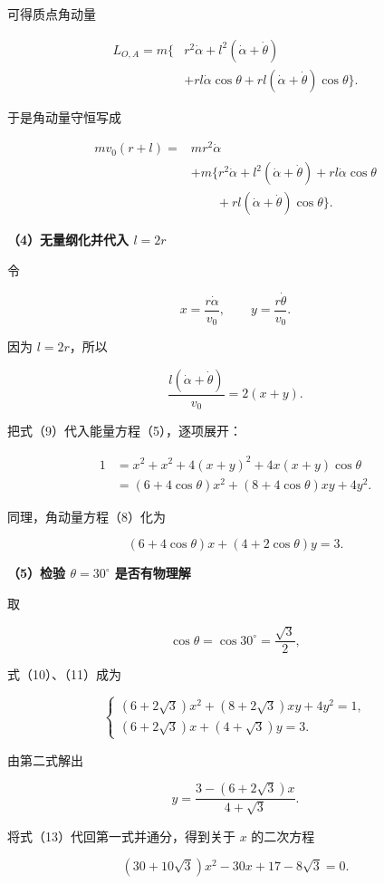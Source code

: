\documentclass[12pt,a4paper,UTF8]{ctexart}
\begin{document}
可得质点角动量

\[
\begin{aligned}
L_{O,A}=m\{&r^2\dot\alpha+l^2(\dot\alpha+\dot\theta)\\
&+rl\dot\alpha\cos\theta
+rl(\dot\alpha+\dot\theta)\cos\theta\}.
\end{aligned}
\tag{7}
\]

于是角动量守恒写成

\[
\begin{aligned}
mv_0(r+l)={}&mr^2\dot\alpha\\
&+m\{r^2\dot\alpha+l^2(\dot\alpha+\dot\theta)
+rl\dot\alpha\cos\theta\\
&\qquad+rl(\dot\alpha+\dot\theta)\cos\theta\}.
\end{aligned}
\tag{8}
\]

\textbf{（4）无量纲化并代入 \(l=2r\)}

令

\[
x=\frac{r\dot\alpha}{v_0},
\qquad
y=\frac{r\dot\theta}{v_0}.
\tag{9}
\]

因为 \(l=2r\)，所以

\[
\frac{l(\dot\alpha+\dot\theta)}{v_0}=2(x+y).
\]

把式（9）代入能量方程（5），逐项展开：

\[
\begin{aligned}
1
&=x^2+x^2+4(x+y)^2+4x(x+y)\cos\theta\\
&=(6+4\cos\theta)x^2
+(8+4\cos\theta)xy+4y^2.
\end{aligned}
\tag{10}
\]

同理，角动量方程（8）化为

\[
(6+4\cos\theta)x+(4+2\cos\theta)y=3.
\tag{11}
\]

\textbf{（5）检验 \(\theta=30^\circ\) 是否有物理解}

取

\[
\cos\theta=\cos30^\circ=\frac{\sqrt3}{2},
\]

式（10）、（11）成为

\[
\begin{cases}
(6+2\sqrt3)x^2+(8+2\sqrt3)xy+4y^2=1,\\
(6+2\sqrt3)x+(4+\sqrt3)y=3.
\end{cases}
\tag{12}
\]

由第二式解出

\[
y=\frac{3-(6+2\sqrt3)x}{4+\sqrt3}.
\tag{13}
\]

将式（13）代回第一式并通分，得到关于 \(x\) 的二次方程

\[
(30+10\sqrt3)x^2-30x+17-8\sqrt3=0.
\tag{14}
\]
\end{document}

